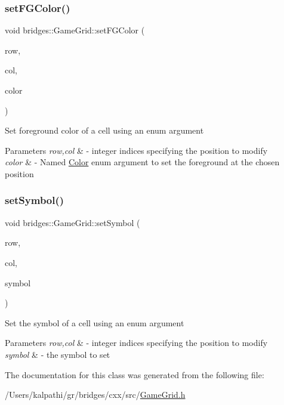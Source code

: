 \subsubsection{\texorpdfstring{setFGColor()}{setFGColor()}}
{\footnotesize\ttfamily void bridges\+::\+Game\+Grid\+::set\+F\+G\+Color (\begin{DoxyParamCaption}\item[{int}]{row,  }\item[{int}]{col,  }\item[{\mbox{\hyperlink{namespacebridges_ad811207d8898a7fd6b72a74725e68357}{Named\+Color}}}]{color }\end{DoxyParamCaption})\hspace{0.3cm}{\ttfamily [inline]}}

Set foreground color of a cell using an enum argument


\begin{DoxyParams}{Parameters}
{\em row,col} & -\/ integer indices specifying the position to modify \\
\hline
{\em color} & -\/ Named \mbox{\hyperlink{classbridges_1_1_color}{Color}} enum argument to set the foreground at the chosen position \\
\hline
\end{DoxyParams}
\mbox{\label{classbridges_1_1_game_grid_a733c0e0cd549248292e08a2dca09637e}} 
\subsubsection{\texorpdfstring{setSymbol()}{setSymbol()}}
{\footnotesize\ttfamily void bridges\+::\+Game\+Grid\+::set\+Symbol (\begin{DoxyParamCaption}\item[{int}]{row,  }\item[{int}]{col,  }\item[{\mbox{\hyperlink{namespacebridges_acfb0a4f7877d8f63de3e6862004c50ed}{Named\+Symbol}}}]{symbol }\end{DoxyParamCaption})\hspace{0.3cm}{\ttfamily [inline]}}

Set the symbol of a cell using an enum argument


\begin{DoxyParams}{Parameters}
{\em row,col} & -\/ integer indices specifying the position to modify \\
\hline
{\em symbol} & -\/ the symbol to set \\
\hline
\end{DoxyParams}


The documentation for this class was generated from the following file\+:\begin{DoxyCompactItemize}
\item 
/\+Users/kalpathi/gr/bridges/cxx/src/\mbox{\hyperlink{_game_grid_8h}{Game\+Grid.\+h}}\end{DoxyCompactItemize}
